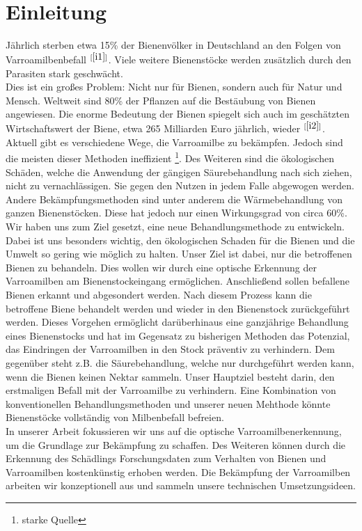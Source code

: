\documentclass[11pt,a4paper]{article}
\newcommand{\bibRef}[1]{\hyperlink{#1}{$^{[\ref*{#1}{}]}$}}
\begin{document}
\section{Einleitung}
Jährlich sterben etwa 15\% der Bienenvölker in Deutschland an den Folgen von Varroamilbenbefall \bibRef{i1}.
Viele weitere Bienenstöcke werden zusätzlich durch den Parasiten stark geschwächt.\\
Dies ist ein großes Problem: Nicht nur für Bienen, sondern auch für Natur und Mensch. Weltweit sind 80\% der Pflanzen auf die Bestäubung von Bienen angewiesen. Die enorme Bedeutung der Bienen spiegelt sich auch im geschätzten Wirtschaftswert der Biene, etwa 265 Milliarden Euro jährlich, wieder \bibRef{i2}.
Aktuell gibt es verschiedene Wege, die Varroamilbe zu bekämpfen. Jedoch sind die meisten dieser Methoden ineffizient \footnote{starke Quelle}. Des Weiteren sind die ökologischen Schäden, welche die Anwendung der gängigen Säurebehandlung nach sich ziehen, nicht zu vernachlässigen. Sie gegen den Nutzen in jedem Falle abgewogen werden. Andere Bekämpfungsmethoden sind unter anderem die Wärmebehandlung von ganzen Bienenstöcken. Diese hat jedoch nur einen Wirkungsgrad von circa 60\%.\\
Wir haben uns zum Ziel gesetzt, eine neue Behandlungsmethode zu entwickeln. Dabei ist uns besonders wichtig, den ökologischen Schaden für die Bienen und die Umwelt so gering wie möglich zu halten. Unser Ziel ist dabei, nur die betroffenen Bienen zu behandeln. Dies wollen wir durch eine optische Erkennung der Varroamilben am Bienenstockeingang ermöglichen. Anschließend sollen befallene Bienen erkannt und abgesondert werden. Nach diesem Prozess kann die betroffene Biene behandelt werden und wieder in den Bienenstock zurückgeführt werden. Dieses Vorgehen ermöglicht darüberhinaus eine ganzjährige Behandlung eines Bienenstocks und hat im Gegensatz zu bisherigen Methoden das Potenzial, das Eindringen der Varroamilben in den Stock präventiv zu verhindern.  Dem gegenüber steht z.B. die Säurebehandlung, welche nur durchgeführt werden kann, wenn die Bienen keinen Nektar sammeln. Unser Hauptziel besteht darin, den erstmaligen Befall mit der Varroamilbe zu verhindern. Eine Kombination von konventionellen Behandlungsmethoden und unserer neuen Mehthode könnte Bienenstöcke vollständig von Milbenbefall befreien.\\
In unserer Arbeit fokussieren wir uns auf die optische Varroamilbenerkennung, um die Grundlage zur Bekämpfung zu schaffen. Des Weiteren können durch die Erkennung des Schädlings Forschungsdaten zum Verhalten von Bienen und Varroamilben kostenkünstig erhoben werden. Die Bekämpfung der Varroamilben arbeiten wir konzeptionell aus und sammeln unsere technischen Umsetzungsideen.\\
\end{document}

